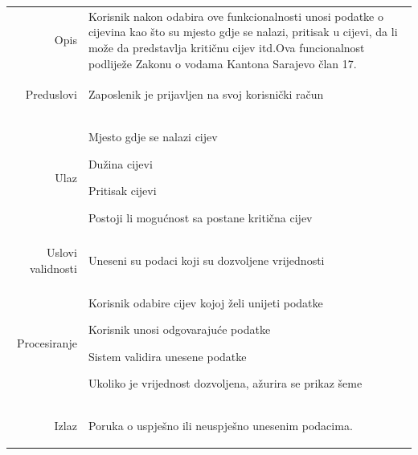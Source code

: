 \documentclass[]{report}
\begin{document}
\begin{tabular}{rp{}}
Opis &
Korisnik nakon odabira ove funkcionalnosti unosi podatke o cijevina kao što su mjesto gdje se nalazi, pritisak u cijevi, da li može da predstavlja kritičnu cijev itd.Ova funcionalnost podliježe Zakonu o vodama Kantona Sarajevo član 17.
\hspace{12pt} 

\\
Preduslovi &
\begin{compactitem}
   \item Zaposlenik je prijavljen na svoj korisnički račun
\end{compactitem}
 
\\
Ulaz &
 
\begin{compactitem}
   \item Mjesto gdje se nalazi cijev
   \item Dužina cijevi
   \item Pritisak cijevi
   \item Postoji li mogućnost sa postane kritična cijev
\end{compactitem}
 
\\
Uslovi validnosti &
 
\begin{compactitem}
       \item Uneseni su podaci koji su dozvoljene vrijednosti
\end{compactitem}
 
\\
Procesiranje &
 
\begin{compactitem}
   \item Korisnik odabire cijev kojoj želi unijeti podatke
   \item Korisnik unosi odgovarajuće podatke
   \item Sistem validira unesene podatke
   \item Ukoliko je vrijednost dozvoljena, ažurira se prikaz šeme
\end{compactitem}
 
\\
Izlaz &
 
\begin{compactitem}
   \item Poruka o uspješno ili neuspješno unesenim podacima.
\end{compactitem}
 

\end{tabular}
\end{document}
